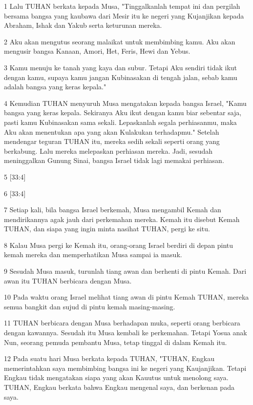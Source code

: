\par 1 Lalu TUHAN berkata kepada Musa, "Tinggalkanlah tempat ini dan pergilah bersama bangsa yang kaubawa dari Mesir itu ke negeri yang Kujanjikan kepada Abraham, Ishak dan Yakub serta keturunan mereka.
\par 2 Aku akan mengutus seorang malaikat untuk membimbing kamu. Aku akan mengusir bangsa Kanaan, Amori, Het, Feris, Hewi dan Yebus.
\par 3 Kamu menuju ke tanah yang kaya dan subur. Tetapi Aku sendiri tidak ikut dengan kamu, supaya kamu jangan Kubinasakan di tengah jalan, sebab kamu adalah bangsa yang keras kepala."
\par 4 Kemudian TUHAN menyuruh Musa mengatakan kepada bangsa Israel, "Kamu bangsa yang keras kepala. Sekiranya Aku ikut dengan kamu biar sebentar saja, pasti kamu Kubinasakan sama sekali. Lepaskanlah segala perhiasanmu, maka Aku akan menentukan apa yang akan Kulakukan terhadapmu." Setelah mendengar teguran TUHAN itu, mereka sedih sekali seperti orang yang berkabung. Lalu mereka melepaskan perhiasan mereka. Jadi, sesudah meninggalkan Gunung Sinai, bangsa Israel tidak lagi memakai perhiasan.
\par 5 [33:4]
\par 6 [33:4]
\par 7 Setiap kali, bila bangsa Israel berkemah, Musa mengambil Kemah dan mendirikannya agak jauh dari perkemahan mereka. Kemah itu disebut Kemah TUHAN, dan siapa yang ingin minta nasihat TUHAN, pergi ke situ.
\par 8 Kalau Musa pergi ke Kemah itu, orang-orang Israel berdiri di depan pintu kemah mereka dan memperhatikan Musa sampai ia masuk.
\par 9 Sesudah Musa masuk, turunlah tiang awan dan berhenti di pintu Kemah. Dari awan itu TUHAN berbicara dengan Musa.
\par 10 Pada waktu orang Israel melihat tiang awan di pintu Kemah TUHAN, mereka semua bangkit dan sujud di pintu kemah masing-masing.
\par 11 TUHAN berbicara dengan Musa berhadapan muka, seperti orang berbicara dengan kawannya. Sesudah itu Musa kembali ke perkemahan. Tetapi Yosua anak Nun, seorang pemuda pembantu Musa, tetap tinggal di dalam Kemah itu.
\par 12 Pada suatu hari Musa berkata kepada TUHAN, "TUHAN, Engkau memerintahkan saya membimbing bangsa ini ke negeri yang Kaujanjikan. Tetapi Engkau tidak mengatakan siapa yang akan Kauutus untuk menolong saya. TUHAN, Engkau berkata bahwa Engkau mengenal saya, dan berkenan pada saya.
